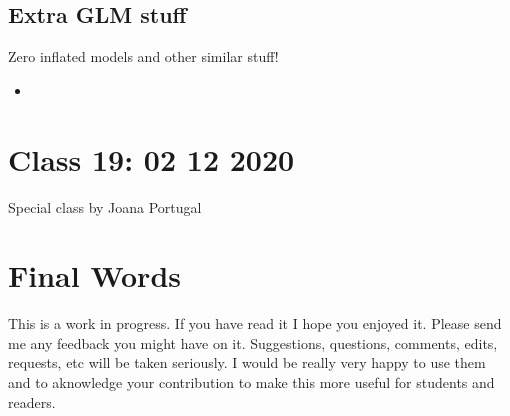 \documentclass[
]{book}
\providecommand{\tightlist}{%
  \setlength{\itemsep}{0pt}\setlength{\parskip}{0pt}}
\begin{document}
\hypertarget{extra-glm-stuff}{%
\section{Extra GLM stuff}\label{extra-glm-stuff}}

Zero inflated models and other similar stuff!

\begin{itemize}
\tightlist
\item
  \citet{Martin2005}
\end{itemize}

\hypertarget{aula19}{%
\chapter{Class 19: 02 12 2020}\label{aula19}}

Special class by Joana Portugal

\hypertarget{final-words}{%
\chapter{Final Words}\label{final-words}}

This is a work in progress. If you have read it I hope you enjoyed it. Please send me any feedback you might have on it. Suggestions, questions, comments, edits, requests, etc will be taken seriously. I would be really very happy to use them and to aknowledge your contribution to make this more useful for students and readers.

  
\end{document}
